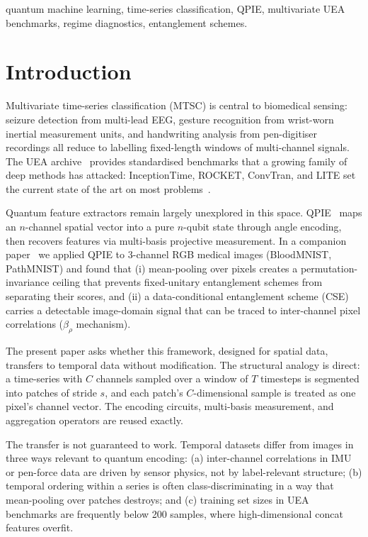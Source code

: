 \documentclass[conference,compsoc]{IEEEtran}
\begin{document}
\begin{IEEEkeywords}
quantum machine learning, time-series classification, QPIE,
multivariate UEA benchmarks, regime diagnostics, entanglement schemes.
\end{IEEEkeywords}

\IEEEpeerreviewmaketitle

\section{Introduction}
\label{sec:intro}

Multivariate time-series classification (MTSC) is central to
biomedical sensing: seizure detection from multi-lead EEG, gesture
recognition from wrist-worn inertial measurement units, and
handwriting analysis from pen-digitiser recordings all reduce to
labelling fixed-length windows of multi-channel signals.
The UEA archive~\cite{bagnall2018uea} provides standardised benchmarks
that a growing family of deep methods has attacked: InceptionTime,
ROCKET, ConvTran, and LITE set the current state of the art on most
problems~\cite{ismail2025lite,dempster2020rocket,foumani2024convtran}.

Quantum feature extractors remain largely unexplored in this space.
QPIE~\cite{yao2017quantum} maps an $n$-channel spatial vector into a
pure $n$-qubit state through angle encoding, then recovers features via
multi-basis projective measurement.
In a companion paper~\cite{atadana2026qpie} we applied QPIE to
3-channel RGB medical images (BloodMNIST, PathMNIST) and found that
(i) mean-pooling over pixels creates a permutation-invariance ceiling
that prevents fixed-unitary entanglement schemes from separating their
scores, and (ii) a data-conditional entanglement scheme (CSE) carries
a detectable image-domain signal that can be traced to inter-channel
pixel correlations ($\beta_\rho$ mechanism).

The present paper asks whether this framework, designed for spatial
data, transfers to temporal data without modification.
The structural analogy is direct: a time-series with $C$ channels
sampled over a window of $T$ timesteps is segmented into patches of
stride $s$, and each patch's $C$-dimensional sample is treated as one
pixel's channel vector.
The encoding circuits, multi-basis measurement, and aggregation
operators are reused exactly.

The transfer is not guaranteed to work.
Temporal datasets differ from images in three ways relevant to
quantum encoding:
(a) inter-channel correlations in IMU or pen-force data are driven by
    sensor physics, not by label-relevant structure;
(b) temporal ordering within a series is often class-discriminating
    in a way that mean-pooling over patches destroys; and
(c) training set sizes in UEA benchmarks are frequently below 200
    samples, where high-dimensional concat features overfit.
\end{document}
